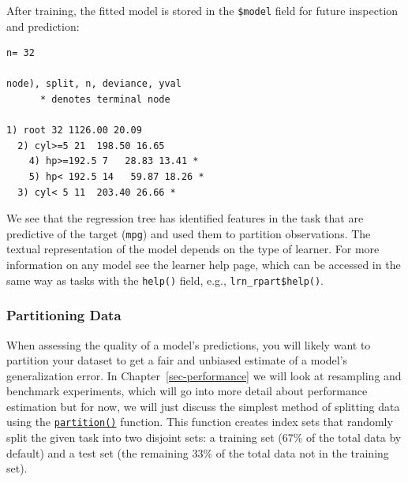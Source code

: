 After training, the fitted model is stored in the
\texttt{\$model}
field for future inspection and prediction:

\begin{Shaded}
\begin{Highlighting}[]
\SpecialCharTok{$}
\end{Highlighting}
\end{Shaded}

\begin{verbatim}
n= 32 

node), split, n, deviance, yval
      * denotes terminal node

1) root 32 1126.00 20.09  
  2) cyl>=5 21  198.50 16.65  
    4) hp>=192.5 7   28.83 13.41 *
    5) hp< 192.5 14   59.87 18.26 *
  3) cyl< 5 11  203.40 26.66 *
\end{verbatim}

We see that the regression tree has identified features in the task that
are predictive of the target (\texttt{mpg}) and used them to partition
observations. The textual representation of the model depends on the
type of learner. For more information on any model see the learner help
page, which can be accessed in the same way as tasks with the
\texttt{help()} field, e.g., \texttt{lrn\_rpart\$help()}.

\hypertarget{sec-basics-partition}{%
\subsubsection{Partitioning Data}\label{sec-basics-partition}}

When assessing the quality of a model's predictions, you will likely
want to partition your dataset to get a fair and unbiased estimate of a
model's generalization error. In Chapter~\ref{sec-performance} we will
look at resampling and benchmark experiments, which will go into more
detail about performance estimation but for now, we will just discuss
the simplest method of splitting data using the
\href{https://mlr3.mlr-org.com/reference/partition.html}{\texttt{partition()}}
function. This function creates index sets that randomly split the given
task into two disjoint sets: a training set (67\%
of the total data by default) and a test set (the
remaining 33\% of the total data not in the training set).

